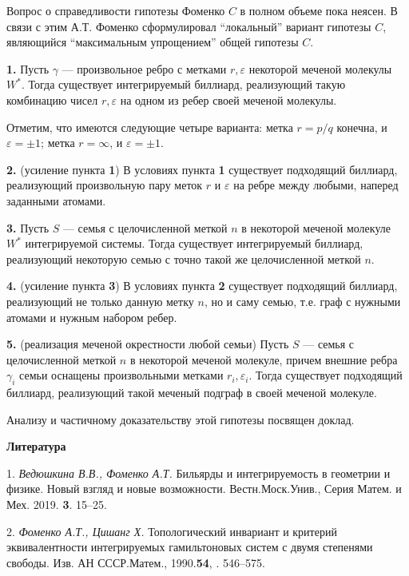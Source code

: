  Вопрос о справедливости гипотезы Фоменко $C$ в полном объеме пока неясен. В связи с этим А.Т. Фоменко сформулировал ``локальный'' вариант гипотезы $C$, являющийся ``максимальным упрощением'' общей гипотезы $C$.

\textbf{1.} Пусть $\gamma$ --- произвольное ребро с метками $r, \varepsilon$ некоторой меченой молекулы $W^{*}$. Тогда существует интегрируемый биллиард, реализующий такую комбинацию чисел $r, \varepsilon$ на одном из ребер своей меченой молекулы.

Отметим, что имеются следующие четыре варианта:  метка $r = p \slash q$ конечна, и $\varepsilon = \pm 1$; метка $r = \infty$, и $\varepsilon = \pm 1$.

\textbf{2. } (усиление пункта \textbf{1}) В условиях пункта \textbf{1} существует подходящий биллиард, реализующий произвольную пару меток  $r$ и $\varepsilon$ на ребре между любыми, наперед заданными атомами.

\textbf{3.} Пусть $S$ --- семья с целочисленной  меткой $n$ в некоторой меченой молекуле $W^{*}$ интегрируемой системы. Тогда существует  интегрируемый биллиард, реализующий некоторую семью с точно такой же целочисленной меткой $n$.

\textbf{4. } (усиление пункта \textbf{3}) В условиях пункта \textbf{2} существует подходящий биллиард, реализующий не только данную метку $n$, но и саму семью, т.е. граф с нужными атомами и нужным набором ребер.

\textbf{5. } (реализация меченой окрестности любой семьи) Пусть $S$ --- семья с целочисленной меткой $n$ в некоторой меченой молекуле, причем внешние ребра $\gamma_i$ семьи оснащены произвольными метками $r_i, \varepsilon_i$. Тогда существует подходящий биллиард, реализующий такой меченый подграф в своей меченой молекуле.


Анализу и частичному доказательству    этой гипотезы посвящен доклад.




\smallskip \centerline {\bf Литература} \nopagebreak

1. {\it Ведюшкина В.В., Фоменко А.Т.} Бильярды и интегрируемость в геометрии и физике. Новый взгляд и новые возможности. Вестн.Моск.Унив., Серия Матем. и Мех. 2019. \textbf{3}. 15--25.

2. {\it Фоменко А.Т., Цишанг Х.} Топологический инвариант и критерий
эквивалентности интегрируемых гамильтоновых систем с двумя степенями
свободы. Изв. АН СССР.Матем.,
1990.\textbf{54}, .
 546--575.

